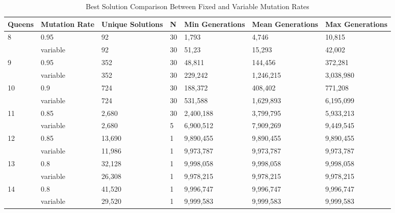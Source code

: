 \documentclass{sig-alternate}
\begin{document}
\begin{table}
\centering
\caption{Best Solution Comparison Between Fixed and Variable Mutation Rates}
\begin{tabular}{|l|l|l|l|l|l|l|} \hline
Queens&               Mutation Rate&  Unique Solutions&   N&      Min Generations&    Mean Generations&   Max Generations\\ \hline
\multirow{2}{*}{8}&   0.95&           92&                 30&     1,793&              4,746&              10,815\\
&                     variable&       92&                 30&     51,23&              15,293&             42,002\\ \hline
\multirow{2}{*}{9}&   0.95&           352&                30&     48,811&             144,456&            372,281\\
&                     variable&       352&                30&     229,242&            1,246,215&          3,038,980\\ \hline
\multirow{2}{*}{10}&  0.9&            724&                30&     188,372&            408,402&            771,208\\
&                     variable&       724&                30&     531,588&            1,629,893&          6,195,099\\ \hline
\multirow{2}{*}{11}&  0.85&           2,680&              30&     2,400,188&          3,799,795&          5,933,213\\
&                     variable&       2,680&              5&      6,900,512&          7,909,269&          9,449,545\\ \hline
\multirow{2}{*}{12}&  0.85&           13,690&             1&      9,890,455&          9,890,455&          9,890,455\\
&                     variable&       11,986&             1&      9,973,787&          9,973,787&          9,973,787\\ \hline
\multirow{2}{*}{13}&  0.8&            32,128&             1&      9,998,058&          9,998,058&          9,998,058\\
&                     variable&       26,308&             1&      9,978,215&          9,978,215&          9,978,215\\ \hline
\multirow{2}{*}{14}&  0.8&            41,520&             1&      9,996,747&          9,996,747&          9,996,747\\
&                     variable&       29,520&             1&      9,999,583&          9,999,583&          9,999,583\\ \hline

\end{tabular}
\end{table}
\end{document}
